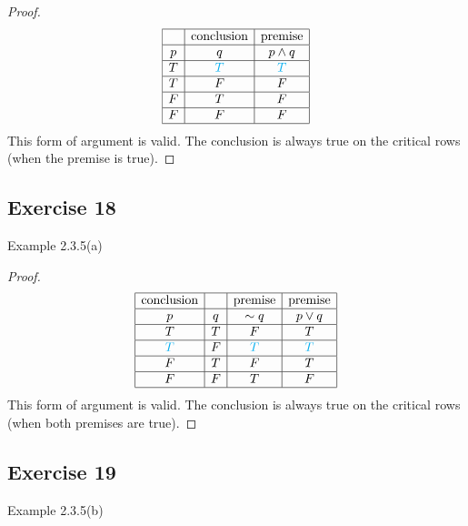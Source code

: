 \documentclass[14pt]{extarticle}
\begin{document}
\begin{proof}
    $$
        \begin{array}{|c|c|c|}
            \hline
              & \text{conclusion} & \text{premise} \\
            \hline
            p & q                 & p \wedge q     \\
            \hline
            T & \color{cyan} T    & \color{cyan} T \\
            \hline
            T & F                 & F              \\
            \hline
            F & T                 & F              \\
            \hline
            F & F                 & F              \\
            \hline
        \end{array}
    $$
    This form of argument is valid. The conclusion is always true on the critical rows (when the premise is true).
\end{proof}

\subsection{Exercise 18}
Example 2.3.5(a)

\begin{proof}
    $$
        \begin{array}{|c|c|c|c|}
            \hline
            \text{conclusion} &   & \text{premise} & \text{premise} \\
            \hline
            p                 & q & {\sim q}       & p \vee q       \\
            \hline
            T                 & T & F              & T              \\
            \hline
            \color{cyan} T    & F & \color{cyan} T & \color{cyan} T \\
            \hline
            F                 & T & F              & T              \\
            \hline
            F                 & F & T              & F              \\
            \hline
        \end{array}
    $$
    This form of argument is valid. The conclusion is always true on the critical rows (when both premises are true).
\end{proof}

\subsection{Exercise 19}
Example 2.3.5(b)
\end{document}
